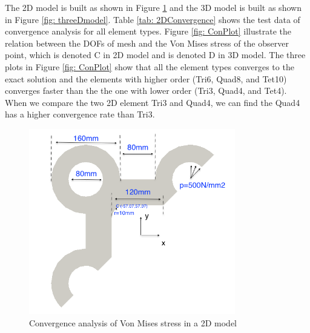 The 2D model is built as shown in Figure \ref{fig: twoDmodel} and the 3D model is built as shown in Figure \ref{fig: threeDmodel}. Table \ref{tab: 2DConvergence} shows the test data of convergence analysis for all element types. Figure \ref{fig: ConPlot} illustrate the relation between the DOFs of mesh and the Von Mises stress of the observer point, which is denoted C in 2D model and is denoted D in 3D model. The three plots in Figure \ref{fig: ConPlot} show that all the element types converges to the exact solution and the elements with higher order (Tri6, Quad8, and Tet10) converges faster than the the one with lower order (Tri3, Quad4, and Tet4). When we compare the two 2D element Tri3 and Quad4, we can find the Quad4 has a higher convergence rate than Tri3. 

\begin{figure}[htbp]
	\begin{center}	
		\includegraphics[width=9cm,clip]{twoDmodel.png} 			
		\caption{Convergence analysis of Von Mises stress in a 2D model} \label{fig: twoDmodel}
	\end{center}
\end{figure}

